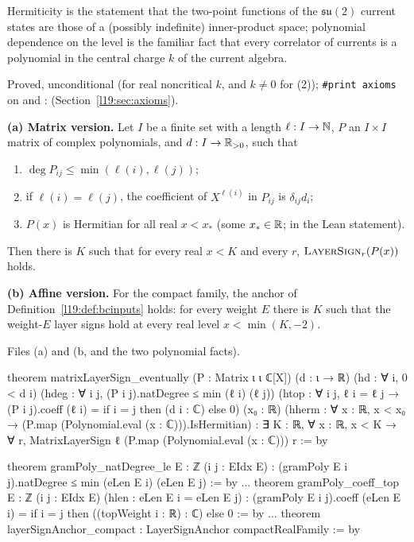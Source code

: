 \begin{physics}
Hermiticity is the statement that the two-point functions of the $\mathfrak{su}(2)$ current states are those of a
(possibly indefinite) inner-product space; polynomial dependence on the level is the familiar fact that every correlator
of currents is a polynomial in the central charge $k$ of the current algebra.
\end{physics}

\begin{status}
Proved, unconditional (for real noncritical $k$, and $k\ne0$ for (2)); \texttt{\#print axioms} on 
and :  (Section~\ref{l19:sec:axioms}).
\end{status}

\begin{theorem}\label{l19:thm:bcanchor}
\textbf{(a) Matrix version.} Let $I$ be a finite set with a length $\ell:I\to{\mathbb{N}}$, $P$ an $I\times I$ matrix of
complex polynomials, and $d:I\to\mathbb{R}_{>0}$, such that
\begin{enumerate}
\item $\deg P_{ij}\le\min(\ell(i),\ell(j))$;
\item if $\ell(i) = \ell(j)$, the coefficient of $X^{\ell(i)}$ in $P_{ij}$ is $\delta_{ij}d_i$;
\item $P(x)$ is Hermitian for all real $x<x_*$ (some $x_*\in\mathbb{R}$;  in the Lean statement).
\end{enumerate}
Then there is $K$ such that for every real $x<K$ and every $r$, $\textsc{LayerSign}_r(P(x))$ holds.

\textbf{(b) Affine version.} For the compact family, the anchor of Definition~\ref{l19:def:bcinputs} holds: for every
weight $E$ there is $K$ such that the weight-$E$ layer signs hold at every real level $x<\min(K,-2)$.
\end{theorem}

{\raggedright\noindent Files  (a) and
 (b, and the two polynomial facts).\par}
\begin{leancode}
theorem matrixLayerSign_eventually (P : Matrix ι ι ℂ[X]) (d : ι → ℝ) (hd : ∀ i, 0 < d i)
    (hdeg : ∀ i j, (P i j).natDegree ≤ min (ℓ i) (ℓ j))
    (htop : ∀ i j, ℓ i = ℓ j → (P i j).coeff (ℓ i) = if i = j then (d i : ℂ) else 0)
    (x₀ : ℝ) (hherm : ∀ x : ℝ, x < x₀ → (P.map (Polynomial.eval (x : ℂ))).IsHermitian) :
    ∃ K : ℝ, ∀ x : ℝ, x < K → ∀ r, MatrixLayerSign ℓ (P.map (Polynomial.eval (x : ℂ))) r := by

theorem gramPoly_natDegree_le {E : ℤ} (i j : EIdx E) :
    (gramPoly E i j).natDegree ≤ min (eLen E i) (eLen E j) := by
...
theorem gramPoly_coeff_top {E : ℤ} (i j : EIdx E) (hlen : eLen E i = eLen E j) :
    (gramPoly E i j).coeff (eLen E i) = if i = j then ((topWeight i : ℝ) : ℂ) else 0 := by
...
theorem layerSignAnchor_compact : LayerSignAnchor compactRealFamily := by
\end{leancode}

